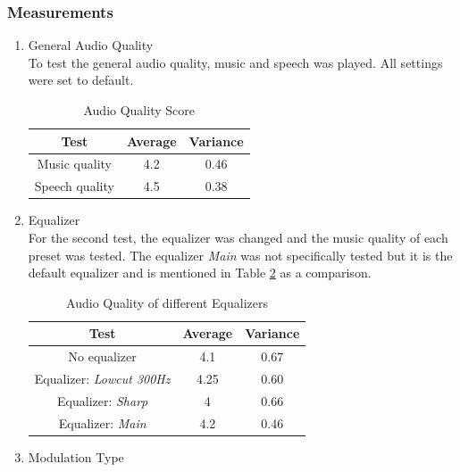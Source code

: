\subsubsection{Measurements}
\begin{enumerate}
    \item General Audio Quality \\
    To test the general audio quality, music and speech was played. All settings were set to default.
    \begin{center}
     \begin{table}[ht]
    \centering
    \begin{tabular}{ |c|c|c|}
      \hline 
      Test & Average & Variance \\ 
      \hline
     Music quality & 4.2 & 0.46 \\
     \hline
     Speech quality & 4.5 & 0.38 \\
     \hline
    \end{tabular}
    \caption{Audio Quality Score}
    \label{6.1.2_tab:music_audio_quality}
    \end{table}   
    \end{center}
    \item Equalizer \\
    For the second test, the equalizer was changed and the music quality of each preset was tested. The equalizer \textit{Main} was not specifically tested but it is the default equalizer and is mentioned in Table \ref{6.1.2_tab:music_audio_quality_eq} as a comparison.
     \begin{center}
     \begin{table}[ht]
    \centering
    \begin{tabular}{ |c|c|c|}
      \hline 
      Test & Average & Variance \\ 
      \hline
     No equalizer & 4.1 & 0.67 \\
     \hline
     Equalizer: \textit{Lowcut 300Hz} & 4.25 & 0.60 \\
     \hline
     Equalizer: \textit{Sharp} & 4 & 0.66 \\
     \hline
     Equalizer: \textit{Main} & 4.2 & 0.46 \\
     \hline
    \end{tabular}
    \caption{Audio Quality of different Equalizers}
    \label{6.1.2_tab:music_audio_quality_eq}
    \end{table}   
    \end{center}
    \item Modulation Type \\

\end{enumerate}

